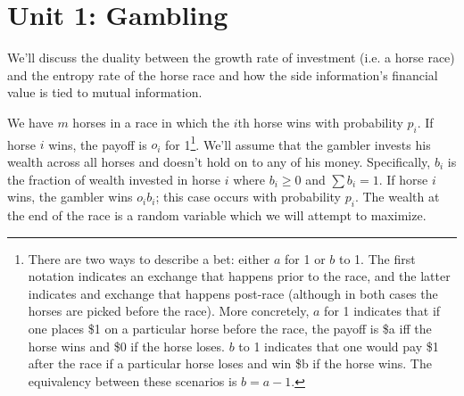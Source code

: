 \documentclass[11pt]{article}
\theoremstyle{definition}
\begin{document}
\title{}
\author{Manan Shah\\ \texttt{manan.shah.777@gmail.com} \\ The Harker School}
\maketitle
\begin{abstract}
This document contains lecture notes from Harker's Advanced Topics in Mathematics class in Information Theory II, taught by Dr. Anuradha Aiyer. This course is the second part of a two part offering that explores the basic concepts of Information Theory, as initially described by Claude Elwood Shannon at Bell Labs in 1948. These notes were taken using TeXShop and \LaTeX2$\epsilon$ and will be updated for each class. The reader is advised to note any errata at the source control repository \texttt{https://github.com/mananshah99/infotheory}.
\end{abstract}
\tableofcontents
\newpage


\section{Unit 1: Gambling}

We'll discuss the duality between the growth rate of investment (i.e. a horse race) and the entropy rate of the horse race and how the side information's financial value is tied to mutual information. 

 We have $m$ horses in a race in which the $i$th horse wins with probability $p_i$. If horse $i$ wins, the payoff is $o_i$ for 1\footnote{There are two ways to describe a bet: either $a$ for 1 or $b$ to 1. The first notation indicates an exchange that happens prior to the race, and the latter indicates and exchange that happens post-race (although in both cases the horses are picked before the race). More concretely, $a$ for 1 indicates that if one places \$1 on a particular horse before the race, the payoff is \$a iff the horse wins and \$0 if the horse loses. $b$ to 1 indicates that one would pay \$1 after the race if a particular horse loses and win \$b if the horse wins. The equivalency between these scenarios is $b = a-1$.}. We'll assume that the gambler invests his wealth across all horses and doesn't hold on to any of his money. Specifically, $b_i$ is the fraction of wealth invested in horse $i$ where $b_i \geq 0$ and $\sum b_i = 1$. If horse $i$ wins, the gambler wins $o_i b_i$; this case occurs with probability $p_i$. The wealth at the end of the race is a random variable which we will attempt to maximize. 
\end{document}
